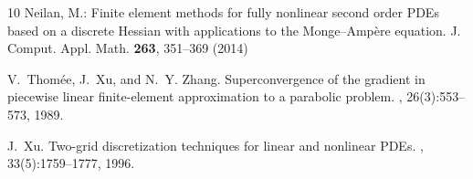 \documentclass[12pt]{amsart}
\numberwithin{equation}{section}
\begin{document}
\begin{thebibliography}{10}
Neilan, M.: Finite element methods for fully nonlinear second order {PDE}s
  based on a discrete {H}essian with applications to the {M}onge--{A}mp\`ere
  equation.
\newblock J. Comput. Appl. Math. \textbf{263}, 351--369 (2014)

V.~Thom{\'e}e, J.~Xu, and N.~Y. Zhang.
\newblock Superconvergence of the gradient in piecewise linear finite-element
  approximation to a parabolic problem.
, 26(3):553--573, 1989.

J.~Xu.
\newblock Two-grid discretization techniques for linear and nonlinear {PDE}s.
, 33(5):1759--1777, 1996.

\end{thebibliography}
\end{document}
